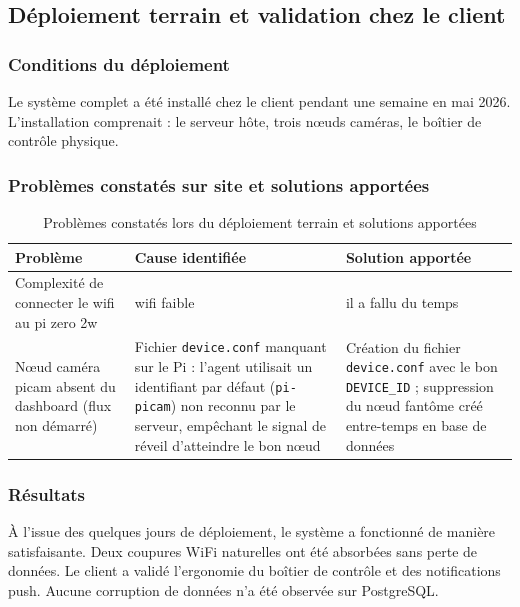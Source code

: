 \documentclass[12pt,a4paper]{article}
\begin{document}
\subsection{Déploiement terrain et validation chez le client}
\label{sec:validation-terrain}

\subsubsection{Conditions du déploiement}
Le système complet a été installé chez le client pendant une semaine en mai 2026. L'installation comprenait : le serveur hôte, trois nœuds caméras, le boîtier de contrôle physique.

\subsubsection{Problèmes constatés sur site et solutions apportées}

\begin{table}[H]
\centering
\small
\renewcommand{\arraystretch}{1.3}
\begin{tabular}{|p{4cm}|p{4.5cm}|p{4.5cm}|}
\hline
\textbf{Problème} & \textbf{Cause identifiée} & \textbf{Solution apportée} \\
\hline
Complexité de connecter le wifi au pi zero 2w & wifi faible & il a fallu du temps \\
\hline
Nœud caméra picam absent du dashboard (flux non démarré) & Fichier \texttt{device.conf} manquant sur le Pi : l'agent utilisait un identifiant par défaut (\texttt{pi-picam}) non reconnu par le serveur, empêchant le signal de réveil d'atteindre le bon nœud & Création du fichier \texttt{device.conf} avec le bon \texttt{DEVICE\_ID} ; suppression du nœud fantôme créé entre-temps en base de données \\
\hline
\end{tabular}
\caption{Problèmes constatés lors du déploiement terrain et solutions apportées}
\end{table}

\subsubsection{Résultats}
À l'issue des quelques jours de déploiement, le système a fonctionné de manière satisfaisante. Deux coupures WiFi naturelles ont été absorbées sans perte de données. Le client a validé l'ergonomie du boîtier de contrôle et des notifications push. Aucune corruption de données n'a été observée sur PostgreSQL.
\end{document}
